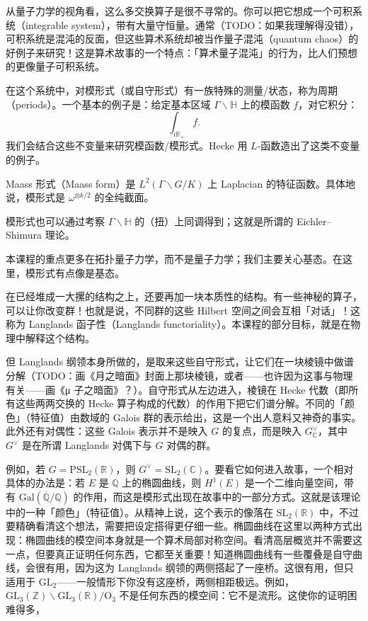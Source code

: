 从量子力学的视角看，这么多交换算子是很不寻常的。你可以把它想成一个可积系统（integrable system），带有大量守恒量。通常（TODO：如果我理解得没错），可积系统是混沌的反面，但这些算术系统却被当作量子混沌（quantum chaos）的好例子来研究！这是算术故事的一个特点：「算术量子混沌」的行为，比人们预想的更像量子可积系统。

在这个系统中，对模形式（或自守形式）有一族特殊的测量/状态，称为周期（periods）。一个基本的例子是：给定基本区域 $\Gamma\backslash\mathbb{H}$ 上的模函数 $f$，对它积分：
\[
\int_{i\mathbb{R}_+} f.
\]
我们会结合这些不变量来研究模函数/模形式。Hecke 用 $L$-函数造出了这类不变量的例子。

\begin{definition}
Maass 形式（Maass form）是 $L^2(\Gamma\backslash G/K)$ 上 Laplacian 的特征函数。具体地说，模形式是 $\omega^{\otimes k/2}$ 的全纯截面。
\end{definition}

模形式也可以通过考察 $\Gamma\backslash\mathbb{H}$ 的（扭）上同调得到；这就是所谓的 Eichler–Shimura 理论。

本课程的重点更多在拓扑量子力学，而不是量子力学；我们主要关心基态。在这里，模形式有点像是基态。

在已经堆成一大摞的结构之上，还要再加一块本质性的结构。有一些神秘的算子，可以让你改变群！也就是说，不同群的这些 Hilbert 空间之间会互相「对话」！这称为 Langlands 函子性（Langlands functoriality）。本课程的部分目标，就是在物理中解释这个结构。

但 Langlands 纲领本身所做的，是取来这些自守形式，让它们在一块棱镜中做谱分解（TODO：画《月之暗面》封面上那块棱镜，或者——也许因为这事与物理有关——画《μ 子之暗面》？）。自守形式从左边进入，棱镜在 Hecke 代数（即所有这些两两交换的 Hecke 算子构成的代数）的作用下把它们谱分解。不同的「颜色」（特征值）由数域的 Galois 群的表示给出，这是一个出人意料又神奇的事实。此外还有对偶性：这些 Galois 表示并不是映入 $G$ 的复点，而是映入 $G^\vee_{\mathbb{C}}$，其中 $G^\vee$ 是在所谓 Langlands 对偶下与 $G$ 对偶的群。

例如，若 $G=\mathrm{PSL}_2(\mathbb{R})$，则 $G^\vee=\mathrm{SL}_2(\mathbb{C})$。要看它如何进入故事，一个相对具体的办法是：若 $E$ 是 $\mathbb{Q}$ 上的椭圆曲线，则 $H^1(E)$ 是一个二维向量空间，带有 $\mathrm{Gal}(\overline{\mathbb{Q}}/\mathbb{Q})$ 的作用，而这是模形式出现在故事中的一部分方式。这就是该理论中的一种「颜色」（特征值）。从精神上说，这个表示的像落在 $\mathrm{SL}_2(\mathbb{R})$ 中，不过要精确看清这个想法，需要把设定搭得更仔细一些。椭圆曲线在这里以两种方式出现：椭圆曲线的模空间本身就是一个算术局部对称空间。看清高层概览并不需要这一点，但要真正证明任何东西，它都至关重要！知道椭圆曲线有一些覆叠是自守曲线，会很有用，因为这为 Langlands 纲领的两侧搭起了一座桥。这很有用，但只适用于 $\mathrm{GL}_2$——一般情形下你没有这座桥，两侧相距极远。例如，$\mathrm{GL}_3(\mathbb{Z})\backslash\mathrm{GL}_3(\mathbb{R})/\mathrm{O}_3$ 不是任何东西的模空间：它不是流形。这使你的证明困难得多，

